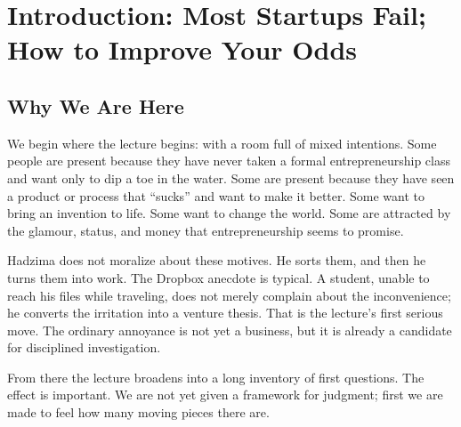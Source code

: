 \chapter{Introduction: Most Startups Fail; How to Improve Your Odds}


\section{Why We Are Here}

We begin where the lecture begins: with a room full of mixed intentions. Some people are present because they have never taken a formal entrepreneurship class and want only to dip a toe in the water. Some are present because they have seen a product or process that ``sucks'' and want to make it better. Some want to bring an invention to life. Some want to change the world. Some are attracted by the glamour, status, and money that entrepreneurship seems to promise.

Hadzima does not moralize about these motives. He sorts them, and then he turns them into work. The Dropbox anecdote is typical. A student, unable to reach his files while traveling, does not merely complain about the inconvenience; he converts the irritation into a venture thesis. That is the lecture's first serious move. The ordinary annoyance is not yet a business, but it is already a candidate for disciplined investigation.

From there the lecture broadens into a long inventory of first questions. The effect is important. We are not yet given a framework for judgment; first we are made to feel how many moving pieces there are.

